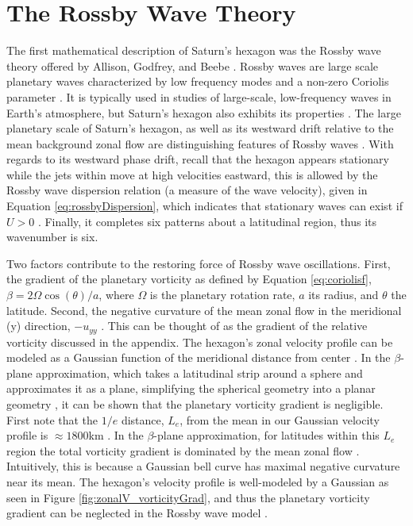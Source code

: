 \documentclass[preprint]{revtex4-1} %
\begin{document}
\section{The Rossby Wave Theory}
\label{sec:rossby}
The first mathematical description of Saturn's hexagon was the Rossby 
wave theory offered by Allison, Godfrey, and Beebe
\cite{Allison1990}. Rossby waves are large scale planetary waves
characterized by low frequency modes and a non-zero Coriolis parameter
\cite{Pedlosky87, PlumbNotes}.  It is typically used in studies
of large-scale, low-frequency waves in Earth's atmosphere, but
Saturn's hexagon also exhibits its properties \cite{Allison1990}.  The large
planetary scale of Saturn's hexagon, as well as its westward drift
relative to the mean background zonal flow are distinguishing features
of Rossby waves \cite{PlumbNotes}.  With regards to its westward phase drift,
recall that the hexagon appears stationary while the jets within move
at high velocities eastward, this is allowed by the Rossby wave
dispersion relation (a measure of the wave velocity), given in Equation
\ref{eq:rossbyDispersion}, which 
indicates that stationary waves can exist if $U>0$ \cite{PlumbNotes}.
Finally, it completes six patterns about a latitudinal region, thus
its wavenumber is six.

Two factors contribute to the
restoring force of Rossby wave oscillations. First, the gradient of the
planetary vorticity as defined by Equation \ref{eq:coriolisf}, $\beta = 2 \Omega
\cos(\theta)/a$, where $\Omega$ 
is the planetary rotation rate, $a$ 
its radius, and $\theta$ the latitude.  Second, the negative
curvature of the mean zonal flow in the meridional (y) direction, $-u_{yy}$
\cite{Allison1990}. This can be thought of as the gradient of the
relative vorticity discussed in the appendix.  The hexagon's zonal
velocity profile can be modeled as a 
Gaussian function of 
the meridional distance from center \cite{Allison1990}.
In the $\beta$-plane approximation, which takes a latitudinal strip
around a sphere and approximates it as a plane, simplifying the
spherical geometry into a planar geometry \cite{PlumbNotes}, it can be
shown that the planetary vorticity gradient is negligible.  First note
that the $1/e$ distance, $L_e$, from the mean in our Gaussian
velocity profile is $\approx 1800$km \cite{Allison1990}.  In the $\beta$-plane
approximation, for latitudes within this $L_e$ region the total
vorticity gradient is dominated by the mean zonal flow
\cite{Allison1990}.  Intuitively, this is because a Gaussian bell curve has
maximal negative curvature near its mean.  The hexagon's velocity
profile is well-modeled by a Gaussian as seen in Figure
\ref{fig:zonalV_vorticityGrad}, and thus the planetary
vorticity gradient can be neglected in the Rossby wave model \cite{Allison1990}.
\end{document}
